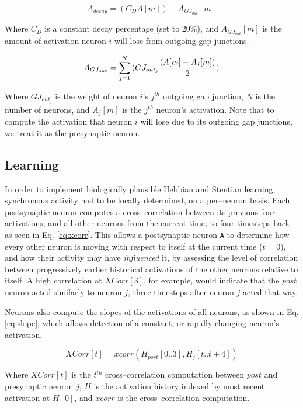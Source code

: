 \documentclass[letterpaper]{article}
\begin{document}
\begin{equation}
    A_{decay} = (C_D A[m]) - A_{GJ_{out}}[m]
\end{equation}

Where $C_D$ is a constant decay percentage (set to 20\%), and $A_{GJ_{out}}[m]$ is the amount of activation neuron $i$ will lose from outgoing gap junctions. 


\begin{equation}
    A_{GJ_{out}} = \sum_{j=1}^{N}{(GJ_{out_j} {(A[m] - A_j[m]) \over 2 })}
\end{equation}

Where $GJ_{out_j}$ is the weight of neuron $i$'s $j^{th}$ outgoing gap junction, $N$ is the number of neurons,  and $A_j[m]$ is the $j^{th}$ neuron's activation. Note that to compute the activation that neuron $i$ will lose due to its outgoing gap junctions, we treat it as the presynaptic neuron. 

\subsection{Learning}

In order to implement biologically plausible Hebbian and Stentian learning, synchronous activity had to be locally determined, on a per--neuron basis. Each postsynaptic neuron computes a cross--correlation between its previous four activations, and all other neurons from the current time, to four timesteps back, as seen in Eq. \ref{eq:xcorr}. This allows a postsynaptic neuron \texttt{A} to determine how every other neuron is moving with respect to itself at the current time ($t=0$), and how their activity may have \textit{influenced} it, by assessing the level of correlation between progressively earlier historical activations of the other neurons relative to itself. A high correlation at $XCorr[3]$, for example, would indicate that the $post$ neuron acted similarly to neuron $j$, three timesteps after neuron $j$ acted that way.

Neurons also compute the slopes of the activations of all neurons, as shown in Eq. \ref{eq:slope}, which allows detection of a constant, or rapidly changing neuron's activation.

\begin{equation}
    \label{eq:xcorr}
    XCorr[t] =  xcorr(H_{post}[0..3], H_{j}[t..t+4])
\end{equation}

Where $XCorr[t]$ is the $t^{th}$ cross--correlation computation between $post$ and presynaptic neuron $j$, $H$ is the activation history indexed by most recent activation at $H[0]$, and $xcorr$ is the cross--correlation computation. 
\end{document}
